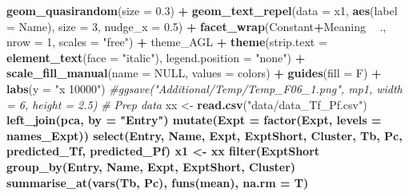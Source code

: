 \documentclass[
]{article}
\newenvironment{Shaded}{\begin{snugshade}}{\end{snugshade}}
\newcommand{\CommentTok}[1]{\textcolor[rgb]{0.56,0.35,0.01}{\textit{#1}}}
\newcommand{\DataTypeTok}[1]{\textcolor[rgb]{0.13,0.29,0.53}{#1}}
\newcommand{\DecValTok}[1]{\textcolor[rgb]{0.00,0.00,0.81}{#1}}
\newcommand{\FloatTok}[1]{\textcolor[rgb]{0.00,0.00,0.81}{#1}}
\newcommand{\KeywordTok}[1]{\textcolor[rgb]{0.13,0.29,0.53}{\textbf{#1}}}
\newcommand{\NormalTok}[1]{#1}
\newcommand{\OperatorTok}[1]{\textcolor[rgb]{0.81,0.36,0.00}{\textbf{#1}}}
\newcommand{\OtherTok}[1]{\textcolor[rgb]{0.56,0.35,0.01}{#1}}
\newcommand{\StringTok}[1]{\textcolor[rgb]{0.31,0.60,0.02}{#1}}
\begin{document}
\begin{Shaded}
\begin{Highlighting}[]
{{{{{{{\StringTok{  }\KeywordTok{geom_quasirandom}\NormalTok{(}\DataTypeTok{size =} \FloatTok{0.3}\NormalTok{) }\OperatorTok{+}\StringTok{ }
\StringTok{  }\KeywordTok{geom_text_repel}\NormalTok{(}\DataTypeTok{data =}\NormalTok{ x1, }\KeywordTok{aes}\NormalTok{(}\DataTypeTok{label =}\NormalTok{ Name), }\DataTypeTok{size =} \DecValTok{3}\NormalTok{, }\DataTypeTok{nudge_x =} \FloatTok{0.5}\NormalTok{) }\OperatorTok{+}
\StringTok{  }\KeywordTok{facet_wrap}\NormalTok{(Constant}\OperatorTok{+}\NormalTok{Meaning }\OperatorTok{~}\StringTok{ }\NormalTok{., }\DataTypeTok{nrow =} \DecValTok{1}\NormalTok{, }\DataTypeTok{scales =} \StringTok{"free"}\NormalTok{) }\OperatorTok{+}\StringTok{ }
\StringTok{  }\NormalTok{theme_AGL }\OperatorTok{+}
\StringTok{  }\KeywordTok{theme}\NormalTok{(}\DataTypeTok{strip.text =} \KeywordTok{element_text}\NormalTok{(}\DataTypeTok{face =} \StringTok{"italic"}\NormalTok{),}
        \DataTypeTok{legend.position =} \StringTok{"none"}\NormalTok{) }\OperatorTok{+}
\StringTok{  }\KeywordTok{scale_fill_manual}\NormalTok{(}\DataTypeTok{name =} \OtherTok{NULL}\NormalTok{, }\DataTypeTok{values =}\NormalTok{ colors) }\OperatorTok{+}
\StringTok{  }\KeywordTok{guides}\NormalTok{(}\DataTypeTok{fill =}\NormalTok{ F) }\OperatorTok{+}
\StringTok{  }\KeywordTok{labs}\NormalTok{(}\DataTypeTok{y =} \StringTok{"x 10000"}\NormalTok{)}
\CommentTok{#ggsave("Additional/Temp/Temp_F06_1.png", mp1, width = 6, height = 2.5)}
\CommentTok{# Prep data}
\NormalTok{xx <-}\StringTok{ }\KeywordTok{read.csv}\NormalTok{(}\StringTok{"data/data_Tf_Pf.csv"}\NormalTok{) }\OperatorTok{%
\StringTok{  }\KeywordTok{left_join}\NormalTok{(pca, }\DataTypeTok{by =} \StringTok{"Entry"}\NormalTok{) }\OperatorTok{%
\StringTok{  }\KeywordTok{mutate}\NormalTok{(}\DataTypeTok{Expt =} \KeywordTok{factor}\NormalTok{(Expt, }\DataTypeTok{levels =}\NormalTok{ names_Expt)) }\OperatorTok{%
\StringTok{  }\KeywordTok{select}\NormalTok{(Entry, Name, Expt, ExptShort, Cluster, Tb, Pc, predicted_Tf, predicted_Pf)}
\NormalTok{x1 <-}\StringTok{ }\NormalTok{xx }\OperatorTok{%
\StringTok{  }\KeywordTok{filter}\NormalTok{(ExptShort }\OperatorTok{%
\StringTok{  }\KeywordTok{group_by}\NormalTok{(Entry, Name, Expt, ExptShort, Cluster) }\OperatorTok{%
\StringTok{  }\KeywordTok{summarise_at}\NormalTok{(}\KeywordTok{vars}\NormalTok{(Tb, Pc), }\KeywordTok{funs}\NormalTok{(mean), }\DataTypeTok{na.rm =}\NormalTok{ T) }
}}}}}}}}}}}}}
\end{Highlighting}
\end{Shaded}
\end{document}
